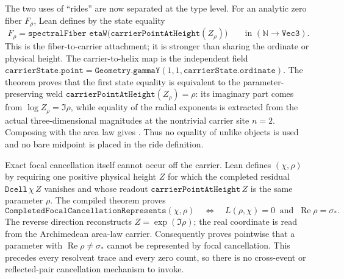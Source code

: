 \documentclass[11pt]{article}
\theoremstyle{definition}
\renewcommand{\Re}{\operatorname{Re}}
\begin{document}
The two uses of ``rides'' are now separated at the type level.  For an
analytic zero fiber \(F_\rho\), Lean defines
 by the state equality
\[
 F_\rho=
 \texttt{spectralFiber etaW}
   \bigl(\texttt{carrierPointAtHeight}(Z_\rho)\bigr)
 \qquad\text{in }(\mathbb N\to\texttt{Vec3}).
\]
This is the fiber-to-carrier attachment; it is stronger than sharing the
ordinate or physical height.  The carrier-to-helix map is the independent
field
\(
  \texttt{carrierState.point}
   =\texttt{Geometry.gammaY}(1,1,\texttt{carrierState.ordinate})
\).
The theorem
 proves that
the first state equality is equivalent to the parameter-preserving weld
\(
 \texttt{carrierPointAtHeight}(Z_\rho)=\rho
\): its imaginary part comes from
\(\log Z_\rho=\Im\rho\), while equality of the radial exponents is extracted
from the actual three-dimensional magnitudes at the nontrivial carrier site
\(n=2\).  Composing with the area law gives
.  Thus no equality of unlike objects is
used and no bare midpoint is placed in the ride definition.

Exact focal cancellation itself cannot occur off the carrier.  Lean defines
$(\chi,\rho)$ by requiring one
positive physical height \(Z\) for which the completed residual
\(\texttt{Dcell}\,\chi\,Z\) vanishes and whose readout
\(\texttt{carrierPointAtHeight}\,Z\) is the same parameter \(\rho\).
The compiled theorem
 proves
\[
 \texttt{CompletedFocalCancellationRepresents}(\chi,\rho)
 \quad\Longleftrightarrow\quad
 L(\rho,\chi)=0\ \text{ and }\ \Re\rho=\sigma_*.
\]
The reverse direction reconstructs \(Z=\exp(\Im\rho)\); the real coordinate
is read from the Archimedean area-law carrier.  Consequently
 proves pointwise that a
parameter with \(\Re\rho\ne\sigma_*\) cannot be represented by focal
cancellation.  This precedes every resolvent trace and every zero count, so
there is no cross-event or reflected-pair cancellation mechanism to invoke.
\end{document}
